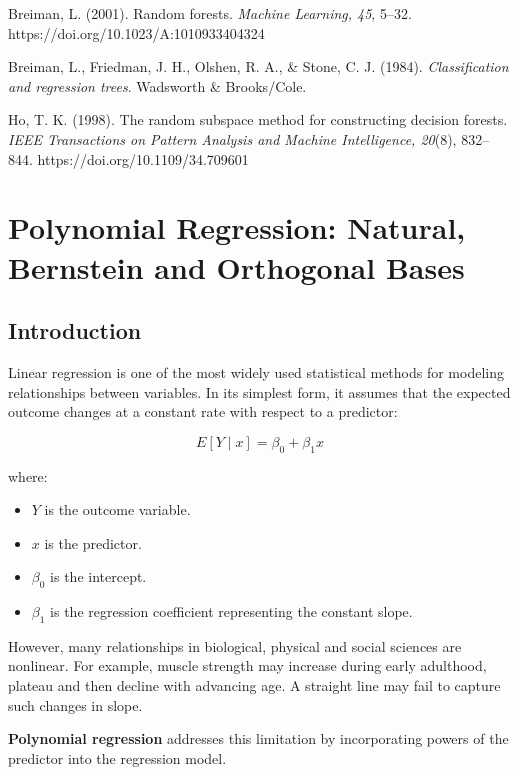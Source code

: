 \documentclass[
  letterpaper,
  DIV=11,
  numbers=noendperiod]{scrreprt}
\providecommand{\tightlist}{%
  \setlength{\itemsep}{0pt}\setlength{\parskip}{0pt}}
\begin{document}
Breiman, L. (2001). Random forests. \emph{Machine Learning, 45}, 5--32.
https://doi.org/10.1023/A:1010933404324

Breiman, L., Friedman, J. H., Olshen, R. A., \& Stone, C. J. (1984).
\emph{Classification and regression trees}. Wadsworth \& Brooks/Cole.

Ho, T. K. (1998). The random subspace method for constructing decision
forests. \emph{IEEE Transactions on Pattern Analysis and Machine
Intelligence, 20}(8), 832--844. https://doi.org/10.1109/34.709601


\chapter{Polynomial Regression: Natural, Bernstein and Orthogonal
Bases}\label{polynomial-regression-natural-bernstein-and-orthogonal-bases}

\section{Introduction}\label{introduction}

Linear regression is one of the most widely used statistical methods for
modeling relationships between variables. In its simplest form, it
assumes that the expected outcome changes at a constant rate with
respect to a predictor:

\[
E[Y \mid x] = \beta_0 + \beta_1 x
\]

where:

\begin{itemize}
\tightlist
\item
  \(Y\) is the outcome variable.
\item
  \(x\) is the predictor.
\item
  \(\beta_0\) is the intercept.
\item
  \(\beta_1\) is the regression coefficient representing the constant
  slope.
\end{itemize}

However, many relationships in biological, physical and social sciences
are nonlinear. For example, muscle strength may increase during early
adulthood, plateau and then decline with advancing age. A straight line
may fail to capture such changes in slope.

\textbf{Polynomial regression} addresses this limitation by
incorporating powers of the predictor into the regression model.
\end{document}
